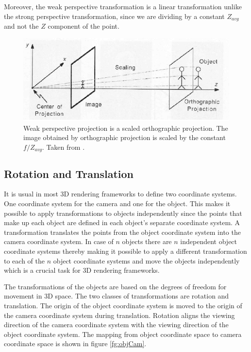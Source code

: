 \documentclass[11pt,a4paper,twoside]{report}
\begin{document}
Moreover, the weak perspective transformation is a linear
transformation unlike the strong perspective transformation, since we are
dividing by a constant $Z_{avg}$ and not the $Z$ component of the
point.

\begin{figure}[H] 
\centering
\includegraphics[scale=0.75]{images/weak_persp.png}
\caption{Weak perspective projection is a scaled orthographic projection. The
  image obtained by orthographic projection is scaled by the constant
  $f/Z_{avg}$. Taken from \cite{projection}.}
\label{fg:weakOrtho}
\end{figure}
  

\subsection{Rotation and Translation}
It is usual in most 3D rendering frameworks to define two coordinate systems. One
coordinate system for the camera and one for the object. This makes it possible
to apply transformations to objects independently since the points that make up each object are defined
in each object's separate coordinate system. A transformation translates the points
from the object coordinate system into the camera coordinate system. In case of $n$ objects there are $n$
independent object coordinate systems thereby making it possible to apply a
different transformation to each of the $n$ object coordinate systems and move
the objects independently which is a crucial task for 3D rendering frameworks.

The transformations of the objects are based on the degrees of freedom for
movement in 3D space. The two classes of transformations are rotation and
translation. The origin of the object coordinate system is moved to the origin
of the camera coordinate system during translation. Rotation aligns the viewing direction
of the camera coordinate system with the viewing direction of the object coordinate
system. The mapping from object coordinate space to camera coordinate space
is shown in figure \ref{fg:objCam}.
\end{document}
